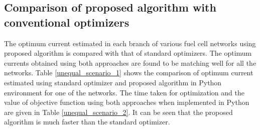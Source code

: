 \documentclass[twocolumn]{autart}
\begin{document}
\subsection{Comparison of proposed algorithm with conventional optimizers}
The optimum current estimated in each branch of various fuel cell networks using proposed algorithm is compared with that of standard optimizers. The optimum currents obtained using both approaches are found to be matching well for all the networks. Table \ref{unequal_scenario_1} shows the comparison of optimum current estimated using standard optimizer and proposed algorithm in Python environment for one of the networks. The time taken for optimization and the value of objective function using both approaches when implemented in Python are given in Table \ref{unequal_scenario_2}. It can be seen that the proposed algorithm is much faster than the standard optimizer. 
\end{document}
